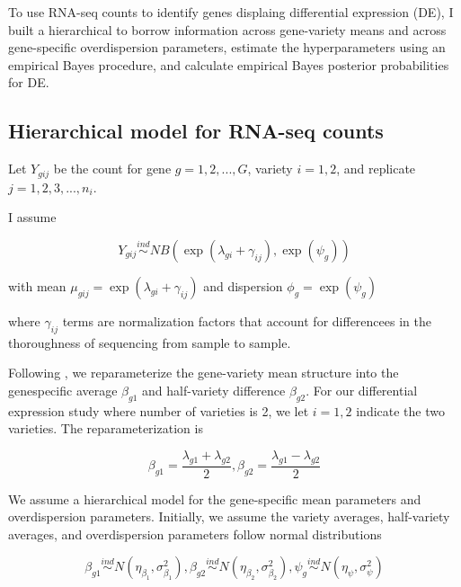 \documentclass[11pt]{isuthesis}
\begin{document}
To use RNA-seq counts to identify genes displaing differential expression (DE), I built a hierarchical to borrow information across gene-variety means and across gene-specific overdispersion parameters, estimate the hyperparameters using an empirical Bayes procedure, and calculate empirical Bayes posterior probabilities for DE. 

\subsection{Hierarchical model for RNA-seq counts}

Let $Y_{gij}$ be the count for gene $g=1,2,..., G$, variety $i=1,2$, and replicate $j=1,2,3,...,n_i$.

I assume

\begin{equation}
\label{eq:1}
Y_{gij} \stackrel{ind}{\sim} NB(\exp(\lambda_{gi}+\gamma_{ij}), \exp(\psi_g))
\end{equation}

with mean $\mu_{gij} = \exp{(\lambda_{gi}+\gamma_{ij})}$ and dispersion $\phi_g = \exp{(\psi_g)}$

where $\gamma_{ij}$ terms are normalization factors that account for differencees in the thoroughness of sequencing from sample to sample. 

Following \citep{ji2014estimation}, we reparameterize the gene-variety mean structure into the genespecific average $\beta_{g1}$ and half-variety difference $\beta_{g2}$. For our differential expression study where number of varieties is 2, we let $i=1,2$ indicate the two varieties. The reparameterization is

\begin{equation}
\label{eq:2}
\beta_{g1} = \frac{\lambda_{g1}+\lambda_{g2}}{2}, \beta_{g2} = \frac{\lambda_{g1}-\lambda_{g2}}{2}
\end{equation}

We assume a hierarchical model for the gene-specific mean parameters and overdispersion parameters. Initially, we assume the variety averages, half-variety averages, and overdispersion parameters follow normal distributions

\begin{equation}
\label{eq:3}
\beta_{g1} \stackrel{ind}{\sim} N(\eta_{\beta_1}, \sigma^2_{\beta_1}), \beta_{g2} \stackrel{ind}{\sim} N(\eta_{\beta_2} , \sigma^2_{\beta_2}), \psi_g \stackrel{ind}{\sim} N(\eta_\psi, \sigma^2_\psi)
\end{equation}
\end{document}
